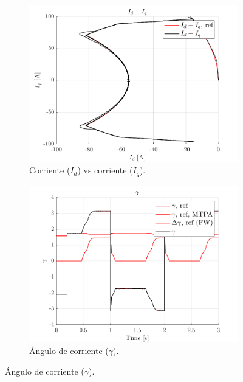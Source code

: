 \begin{figure}[H]
    \begin{subfigure}{0.4\textwidth}
        \includegraphics[width=\linewidth]{fig/PLECS_id-iq.png}
        \caption{Corriente ($I_{d}$) vs corriente ($I_{q}$).}
    \end{subfigure}
    \begin{subfigure}{0.4\textwidth}
        \includegraphics[width=\linewidth]{fig/PLECS_gamma.png}
        \caption{Ángulo de corriente ($\gamma$).}
    \end{subfigure}


\end{figure}
